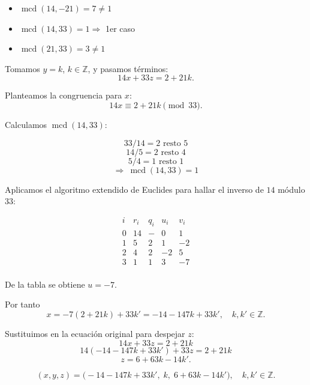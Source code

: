 \documentclass[a4paper,12pt]{article}
\begin{document}
\begin{ejercicio}[title=Ejercicio 33]

\begin{itemize}
    \item $\operatorname{mcd}(14,-21)=7\ne 1$
    \item $\operatorname{mcd}(14,33)=1 \Rightarrow$ 1er caso
    \item $\operatorname{mcd}(21,33)=3\ne 1$
\end{itemize}

Tomamos $y=k$, $k\in\mathbb{Z}$, y pasamos términos:
\[
14x + 33z = 2 + 21k.
\]

Planteamos la congruencia para $x$:
\[
14x \equiv 2 + 21k \pmod{33}.
\]

Calculamos $\operatorname{mcd}(14,33)$:

\[
33 / 14 = 2 \text{ resto } 5
\]
\[
14 / 5 = 2 \text{ resto } 4
\]
\[
5 / 4 = 1 \text{ resto } \boxed{1}
\]
\[
\Rightarrow\ \operatorname{mcd}(14,33)=\boxed{1}
\]

Aplicamos el algoritmo extendido de Euclides para hallar el inverso de $14$ módulo $33$:

\[
\begin{array}{c|c|c|c|c}
i & r_i & q_i & u_i & v_i \\ \hline
0 & 14 & - & 0 & 1 \\
1 & 5  & 2 & 1 & -2 \\
2 & 4  & 2 & -2 & 5 \\
3 & \boxed{1} & 1 & 3 & -7 \\
\end{array}
\]

De la tabla se obtiene $u = -7$.

\vspace{0.5em}

Por tanto
\[
x = -7(2+21k) + 33k' = -14 -147k + 33k',\quad k,k'\in\mathbb{Z}.
\]

Sustituimos en la ecuación original para despejar $z$:
\[
14x + 33z = 2 + 21k
\]
\[
14(-14 -147k + 33k') + 33z = 2 + 21k
\]
\[
z = 6 + 63k - 14k'.
\]

\[
\boxed{(x,y,z)=\bigl(-14-147k+33k',\; k,\; 6+63k-14k'\bigr),\quad k,k'\in\mathbb{Z}.}
\]

\end{ejercicio}
\end{document}
